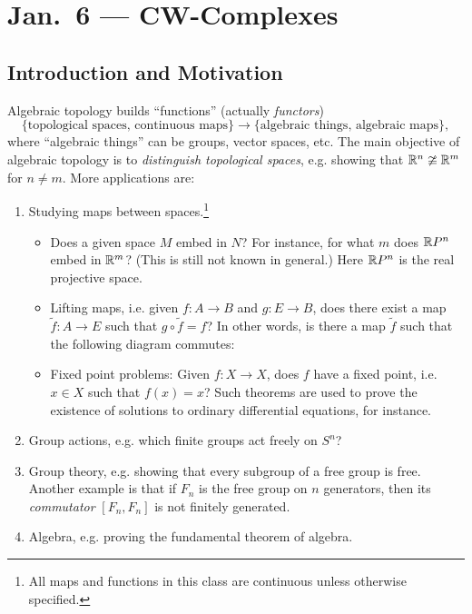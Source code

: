\chapter{Jan.~6 --- CW-Complexes}

\section{Introduction and Motivation}
Algebraic topology builds ``functions'' (actually
\emph{functors})
\[
  \{
    \text{topological spaces, continuous maps}
  \}
  \longrightarrow
  \{
    \text{algebraic things, algebraic maps}
  \},
\]
where ``algebraic things'' can be groups, vector
spaces, etc. The main objective of algebraic topology is
to \emph{distinguish topological spaces}, e.g.
showing that $\mathbb{R}^n \ncong \mathbb{R}^m$ for $n \ne m$.
More applications are:
\begin{enumerate}
  \item Studying maps between spaces.\footnote{All maps and functions in this class are continuous unless otherwise specified.}
    \begin{itemize}
      \item Does a given space $M$ embed in $N$? For
        instance, for what $m$ does $\mathbb{R} P^n$ embed
        in $\mathbb{R}^m$? (This is still not known in general.)
        Here $\mathbb{R} P^n$ is the real projective space.
      \item Lifting maps, i.e. given
        $f : A \to B$ and $g : E \to B$, does
        there exist a map $\widetilde{f} : A \to E$
        such that $g \circ \widetilde{f} = f$?
        In other words, is there a map $\widetilde{f}$
        such that the following diagram commutes:
        \begin{center}
        \end{center}
      \item Fixed point problems: Given $f : X \to X$,
        does $f$ have a fixed point, i.e. $x \in X$
        such that $f(x) = x$? Such theorems are used
        to prove the existence of solutions to
        ordinary differential equations, for instance.
    \end{itemize}
  \item Group actions, e.g. which finite groups act
    freely on $S^n$?
  \item Group theory, e.g. showing that every subgroup of a free
    group is free.
    Another example is that if $F_n$ is
    the free group on $n$ generators, then
    its \emph{commutator} $[F_n, F_n]$ is not
    finitely generated.
  \item Algebra, e.g. proving the fundamental theorem
    of algebra.
\end{enumerate}

